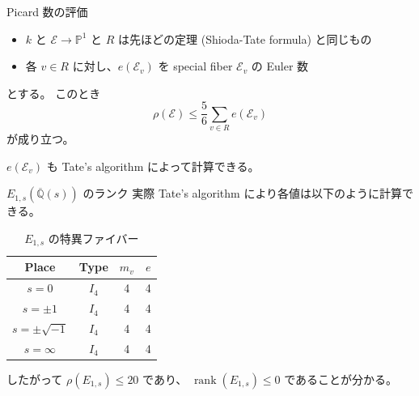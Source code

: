 \documentclass{classes/mybeamer}
\DeclareMathOperator{\rank}{rank}
\begin{document}
\begin{frame}{Picard 数の評価}
    \begin{proposition}
        \begin{itemize}
            \item $k$ と $\mathcal{E} \to \mathbb{P}^1$ と $R$ は先ほどの定理 (Shioda-Tate formula) と同じもの
            \item 各 $v \in R$ に対し、$e(\mathcal{E}_v)$ を special fiber $\mathcal{E}_v$ の Euler 数
        \end{itemize}
        とする。
        このとき
        \begin{equation*}
            \rho(\mathcal{E}) \leq \frac{5}{6} \sum_{v \in R} e(\mathcal{E}_v)
        \end{equation*}
        が成り立つ。
    \end{proposition}
    $e(\mathcal{E}_v)$ も Tate's algorithm によって計算できる。
\end{frame}

\begin{frame}{$E_{1,s}(\overline{\mathbb{Q}}(s))$ のランク}
    実際 Tate's algorithm により各値は以下のように計算できる。
    \begin{table}[htbp]
        \centering
        \caption{$E_{1,s}$ の特異ファイバー}
        \begin{tabular}{|c|c|c|c|}
            \hline
            Place             & Type  & $m_v$ & $e$ \\
            \hline
            $s=0$             & $I_4$ & 4     & 4   \\
            $s=\pm 1$         & $I_4$ & 4     & 4   \\
            $s=\pm \sqrt{-1}$ & $I_4$ & 4     & 4   \\
            $s=\infty$        & $I_4$ & 4     & 4   \\
            \hline
        \end{tabular}
    \end{table}
    したがって $\rho(E_{1,s}) \leq 20$ であり、 $\rank(E_{1,s}) \leq 0$ であることが分かる。
\end{frame}
\end{document}
